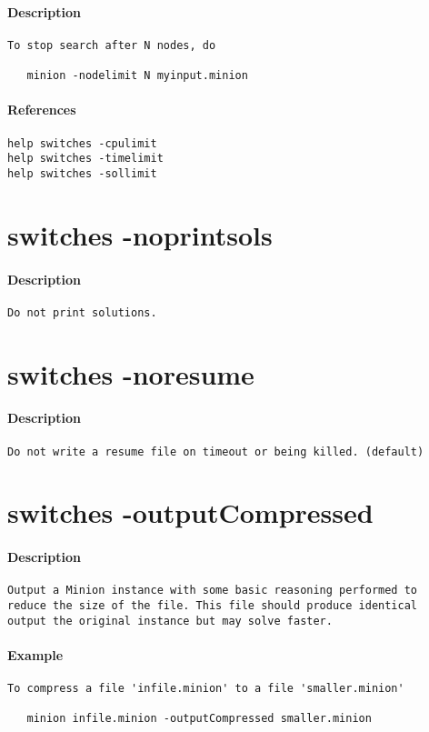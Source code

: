 \paragraph{Description}
{\footnotesize
\begin{verbatim}
To stop search after N nodes, do

   minion -nodelimit N myinput.minion
\end{verbatim}
}
\paragraph{References}
{\footnotesize
\begin{verbatim}
help switches -cpulimit
help switches -timelimit
help switches -sollimit
\end{verbatim}
}
\section{switches -noprintsols}
\paragraph{Description}
{\footnotesize
\begin{verbatim}
Do not print solutions.
\end{verbatim}
}
\section{switches -noresume}
\paragraph{Description}
{\footnotesize
\begin{verbatim}
Do not write a resume file on timeout or being killed. (default)
\end{verbatim}
}
\section{switches -outputCompressed}
\paragraph{Description}
{\footnotesize
\begin{verbatim}
Output a Minion instance with some basic reasoning performed to
reduce the size of the file. This file should produce identical
output the original instance but may solve faster.
\end{verbatim}
}
\paragraph{Example}
{\footnotesize
\begin{verbatim}
To compress a file 'infile.minion' to a file 'smaller.minion'

   minion infile.minion -outputCompressed smaller.minion
\end{verbatim}
}
